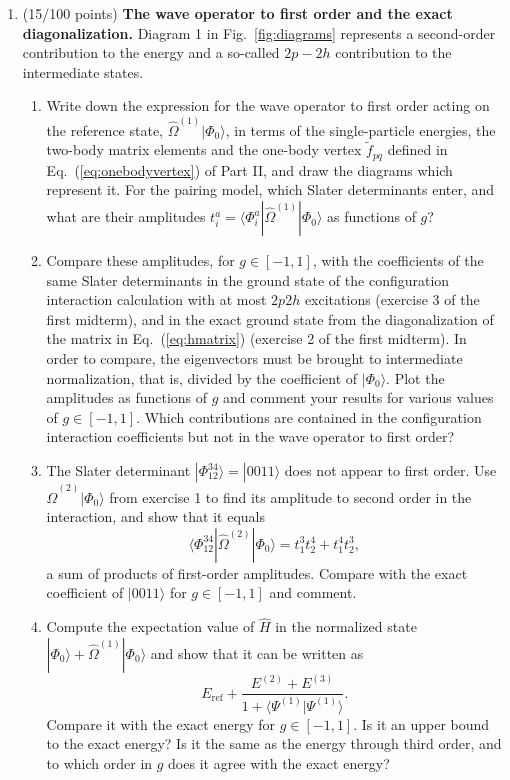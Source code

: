 \documentclass[prc]{revtex4}
\begin{document}
\begin{enumerate}
\item (15/100 points) \textbf{The wave operator to first order and the exact
  diagonalization.}
Diagram 1 in Fig.~\ref{fig:diagrams} represents a second-order
contribution to the energy and a so-called $2p-2h$ contribution to the
intermediate states.
\begin{enumerate}
\item Write down the expression for the wave operator to first order
  acting on the reference state,
  $\hat{\Omega}^{(1)}|\Phi_0\rangle$, in terms of the single-particle
  energies, the two-body matrix elements and the one-body vertex
  $\tilde{f}_{pq}$ defined in Eq.~(\ref{eq:onebodyvertex}) of Part II,
  and draw the diagrams which represent it. For the pairing model,
  which Slater determinants enter, and what are their amplitudes
  $t_i^a=\langle\Phi_i^a|\hat{\Omega}^{(1)}|\Phi_0\rangle$ as functions
  of $g$?
\item Compare these amplitudes, for $g\in[-1,1]$, with the
  coefficients of the same Slater determinants in the ground state of
  the configuration interaction calculation with at most $2p2h$
  excitations (exercise 3 of the first midterm), and in the exact
  ground state from the diagonalization of the matrix in
  Eq.~(\ref{eq:hmatrix}) (exercise 2 of the first midterm). In order to
  compare, the eigenvectors must be brought to intermediate
  normalization, that is, divided by the coefficient of
  $|\Phi_0\rangle$. Plot the amplitudes as functions of $g$ and
  comment your results for various values of $g\in[-1,1]$. Which
  contributions are contained in the configuration interaction
  coefficients but not in the wave operator to first order?
\item The Slater determinant $|\Phi_{12}^{34}\rangle=|0011\rangle$ does
  not appear to first order. Use
  $\hat{\Omega}^{(2)}|\Phi_0\rangle$ from exercise 1 to find its
  amplitude to second order in the interaction, and show that it
  equals
\[
\langle\Phi_{12}^{34}|\hat{\Omega}^{(2)}|\Phi_0\rangle
=t_1^3t_2^4+t_1^4t_2^3 ,
\]
  a sum of products of first-order amplitudes. Compare with the exact
  coefficient of $|0011\rangle$ for $g\in[-1,1]$ and comment.
\item Compute the expectation value of $\hat{H}$ in the normalized
  state
  $|\Phi_0\rangle+\hat{\Omega}^{(1)}|\Phi_0\rangle$ and show that it
  can be written as
\[
E_{\mathrm{ref}}+\frac{E^{(2)}+E^{(3)}}
{1+\langle\Psi^{(1)}|\Psi^{(1)}\rangle} .
\]
  Compare it with the exact energy for $g\in[-1,1]$. Is it an upper
  bound to the exact energy? Is it the same as the energy through
  third order, and to which order in $g$ does it agree with the exact
  energy?
\end{enumerate}
\end{enumerate}
\end{document}
